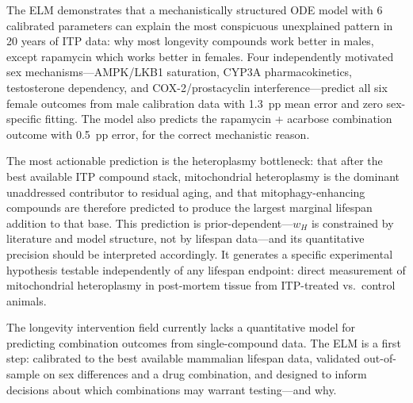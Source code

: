 \documentclass[11pt]{article}
\begin{document}
The ELM demonstrates that a mechanistically structured ODE model with 6 calibrated parameters can explain the most conspicuous unexplained pattern in 20 years of ITP data: why most longevity compounds work better in males, except rapamycin which works better in females. Four independently motivated sex mechanisms---AMPK/LKB1 saturation, CYP3A pharmacokinetics, testosterone dependency, and COX-2/prostacyclin interference---predict all six female outcomes from male calibration data with 1.3~pp mean error and zero sex-specific fitting. The model also predicts the rapamycin + acarbose combination outcome with 0.5~pp error, for the correct mechanistic reason.

The most actionable prediction is the heteroplasmy bottleneck: that after the best available ITP compound stack, mitochondrial heteroplasmy is the dominant unaddressed contributor to residual aging, and that mitophagy-enhancing compounds are therefore predicted to produce the largest marginal lifespan addition to that base. This prediction is prior-dependent---$w_H$ is constrained by literature and model structure, not by lifespan data---and its quantitative precision should be interpreted accordingly. It generates a specific experimental hypothesis testable independently of any lifespan endpoint: direct measurement of mitochondrial heteroplasmy in post-mortem tissue from ITP-treated vs.\ control animals.

The longevity intervention field currently lacks a quantitative model for predicting combination outcomes from single-compound data. The ELM is a first step: calibrated to the best available mammalian lifespan data, validated out-of-sample on sex differences and a drug combination, and designed to inform decisions about which combinations may warrant testing---and why.




\end{document}

